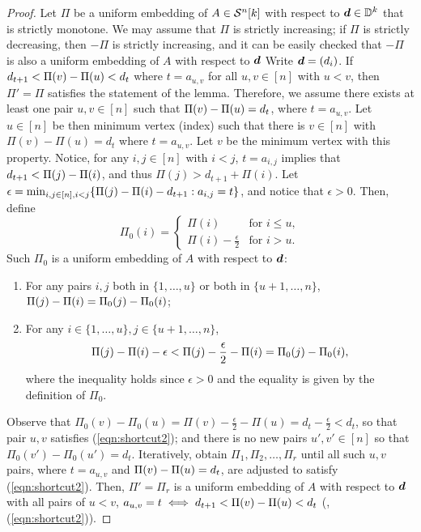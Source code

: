 \documentclass[runningheads]{llncs}
\begin{document}
\begin{proof}
Let $\Pi$ be a uniform embedding of $A\in\calS^n[k]$ with respect to $\bmd\in\bmD$ that is strictly monotone. We may assume that $\Pi$ is strictly increasing; if $\Pi$ is strictly decreasing, then $-\Pi$ is strictly increasing, and it can be easily checked that $-\Pi$ is also a uniform embedding of $A$ with respect to $\bmd$
Write $\bmd=(d_i)$. If $d_{t+1}<\dist uv<d_t$ where $t = a_{u,v}$ for all $u,v\in[n]$ with $u<v$, then $\Pi' = \Pi$ satisfies the statement of the lemma. Therefore, we assume there exists at least one pair $u,v\in[n]$ such that $\dist uv = d_t$, where $t = a_{u,v}$. 
Let $u\in[n]$ be then minimum vertex (index) such that there is $v\in[n]$ with $\Pi(v)-\Pi(u) = d_t$ where $t = a_{u,v}$.
Let $v$ be the minimum vertex with this property. 
Notice, for any $i,j\in[n]$ with $i<j$, $t = a_{i,j}$ implies that $d_{t+1} < \dist ij$, and thus $\Pi(j)>d_{t+1} + \Pi(i)$. Let $\epsilon = \min_{i,j\in[n],i<j} \{\dist ij-d_{t+1}:a_{i,j} = t\}$, and notice that $\epsilon > 0$. Then, define 
$$\Pi_0(i) = \left\{
\begin{array}{ll}
    \Pi(i) &\text{for }i\leq u,  \\
    \Pi(i)-\frac\epsilon2 & \text{for }i> u.
\end{array}
\right.$$
Such $\Pi_0$ is a uniform embedding of $A$ with respect to $\bmd$:
\begin{enumerate}
\item For any pairs $i,j$ both in $\{1,\dots, u\}$ or both in $\{u+1,\dots, n\}$, $\dist ij = \Pi_0(j)-\Pi_0(i)$; 
\item For any $i\in\{1,\dots, u\}, j\in\{u+1,\dots, n\}$, 
$$\dist ij - \epsilon < \Pi(j) - \frac\epsilon2 - \Pi(i) = \Pi_0(j)-\Pi_0(i),$$ where the inequality holds since $\epsilon>0$ and the equality is given by the definition of $\Pi_0$. 
\end{enumerate}
Observe that $\Pi_0(v)-\Pi_0(u) = \Pi(v) - \frac\epsilon2-\Pi(u) = d_t-\frac\epsilon2 <d_t$, so that pair $u,v$ satisfies (\ref{eqn:shortcut2});
and there is no new pairs $u', v'\in[n]$ so that $\Pi_0(v')-\Pi_0(u')= d_t.$  
Iteratively, obtain $\Pi_1, \Pi_2,\dots, \Pi_r$ until all such $u,v$ pairs, where $t= a_{u,v}$ and $\dist uv=d_t$, are adjusted to satisfy (\ref{eqn:shortcut2}). 
Then, $\Pi' = \Pi_r$ is a uniform embedding of $A$ with respect to $\bmd$ with all pairs of $u<v$, $a_{u,v} = t\iff d_{t+1}<\dist uv<d_t$ (\ie, (\ref{eqn:shortcut2})).
\end{proof}


\end{document}
